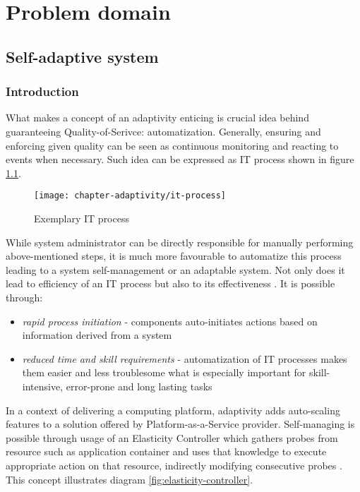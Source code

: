 \chapter{Problem domain}

\section{Self-adaptive system}

\subsection{Introduction}
What makes a concept of an adaptivity enticing is crucial idea behind guaranteeing Quality-of-Serivce: automatization. Generally, ensuring and enforcing given quality can be seen as continuous monitoring and reacting to events when necessary. Such idea can be expressed as IT process shown in figure \ref{fig:it-process}.

\begin{figure}[!ht]
  \begin{center}
    \texttt{[image: chapter-adaptivity/it-process]}
  \end{center}
  \caption{Exemplary IT process}
  \label{fig:it-process}
\end{figure}

While system administrator can be directly responsible for manually performing above-mentioned steps, it is much more favourable to automatize this process leading to a system self-management or an adaptable system. Not only does it lead to efficiency of an IT process but also to its effectiveness \cite{IBM06}. It is possible through:
\begin{itemize}
  \item \emph{rapid process initiation} - components auto-initiates actions based on information derived from a system
  \item \emph{reduced time and skill requirements} - automatization of IT processes makes them easier and less troublesome what is especially important for skill-intensive, error-prone and long lasting tasks
\end{itemize}

In a context of delivering a computing platform, adaptivity adds auto-scaling features to a solution offered by Platform-as-a-Service provider. Self-managing is possible through usage of an Elasticity Controller which gathers probes from resource such as application container and uses that knowledge to execute appropriate action on that resource, indirectly modifying consecutive probes \cite{VaRoBu11}. This concept illustrates diagram \ref{fig:elasticity-controller}.

